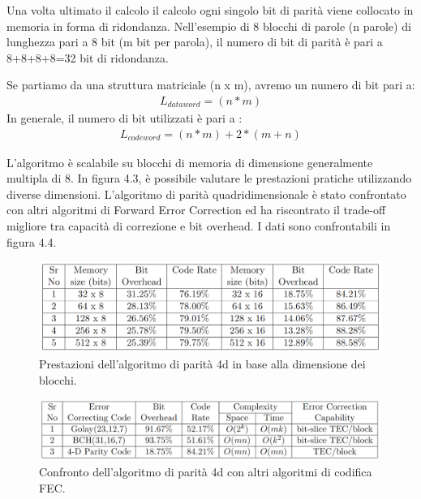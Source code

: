 \documentclass[LaM,binding=0.6cm]{../sapthesis}
\begin{document}
Una volta ultimato il calcolo il calcolo ogni singolo bit di parità viene collocato in memoria in forma di ridondanza. 
Nell’esempio di 8 blocchi di parole (n parole) di lunghezza pari a 8 bit (m bit per parola), il numero di bit di parità è pari a 8+8+8+8=32 bit di ridondanza.

Se partiamo da una struttura matriciale (n x m), avremo un numero di bit pari a:
\begin{align}
L_{dataword} = (n * m) 
\end{align}
In generale, il numero di bit utilizzati è pari a :
\begin{align}
L_{codeword} = (n * m) + 2 * (m+n)
\end{align}

L'algoritmo è scalabile su blocchi di memoria di dimensione generalmente multipla di 8. In figura 4.3, è possibile valutare le prestazioni pratiche utilizzando diverse dimensioni.
\newline
L'algoritmo di parità quadridimensionale è stato confrontato con altri algoritmi di Forward Error Correction ed ha riscontrato il trade-off migliore tra capacità di correzione e bit overhead. I dati sono confrontabili in figura 4.4.

\begin{figure}[htbp]
\centerline{\includegraphics[scale=0.48]{examples/4dPerformance1.PNG}}
\caption{Prestazioni dell'algoritmo di parità 4d in base alla dimensione dei blocchi.}
\label{fig}
\end{figure}
\newline

\begin{figure}[htbp]
\centerline{\includegraphics[scale=0.48]{examples/4dComparison.PNG}}
\caption{Confronto dell'algoritmo di parità 4d con altri algoritmi di codifica FEC.}
\label{fig}
\end{figure}
\newline
\end{document}
